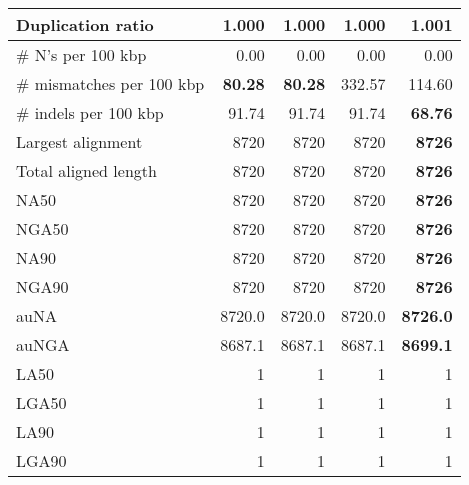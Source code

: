 \documentclass[12pt,a4paper]{article}
\begin{document}
\begin{table}[ht]
\begin{center}
\begin{tabular}{|l*{4}{|r}|}
Duplication ratio & {\bf 1.000} & {\bf 1.000} & {\bf 1.000} & 1.001 \\ \hline
\# N's per 100 kbp & 0.00 & 0.00 & 0.00 & 0.00 \\ \hline
\# mismatches per 100 kbp & {\bf 80.28} & {\bf 80.28} & 332.57 & 114.60 \\ \hline
\# indels per 100 kbp & 91.74 & 91.74 & 91.74 & {\bf 68.76} \\ \hline
Largest alignment & 8720 & 8720 & 8720 & {\bf 8726} \\ \hline
Total aligned length & 8720 & 8720 & 8720 & {\bf 8726} \\ \hline
NA50 & 8720 & 8720 & 8720 & {\bf 8726} \\ \hline
NGA50 & 8720 & 8720 & 8720 & {\bf 8726} \\ \hline
NA90 & 8720 & 8720 & 8720 & {\bf 8726} \\ \hline
NGA90 & 8720 & 8720 & 8720 & {\bf 8726} \\ \hline
auNA & 8720.0 & 8720.0 & 8720.0 & {\bf 8726.0} \\ \hline
auNGA & 8687.1 & 8687.1 & 8687.1 & {\bf 8699.1} \\ \hline
LA50 & 1 & 1 & 1 & 1 \\ \hline
LGA50 & 1 & 1 & 1 & 1 \\ \hline
LA90 & 1 & 1 & 1 & 1 \\ \hline
LGA90 & 1 & 1 & 1 & 1 \\ \hline
\end{tabular}
\end{center}
\end{table}
\end{document}
